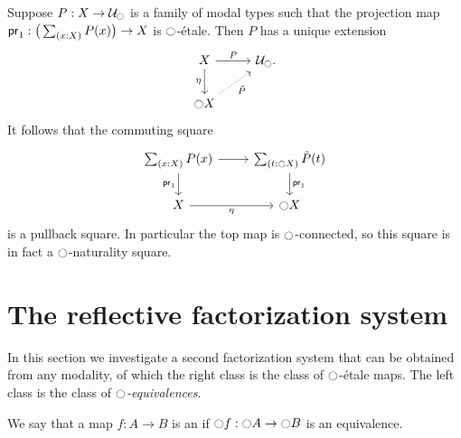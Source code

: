 \documentclass[9pt,twosided]{amsart}
\begin{document}
\begin{cor}
Suppose $P:X\to\mathcal{U}_{\ocircle}$ is a family of modal types such that the projection map $\proj 1:\big(\sm{x:X}P(x)\big)\to X$ is ${\ocircle}$-\'etale. Then $P$ has a unique extension
\begin{equation*}
\begin{tikzcd}
X \arrow[d,swap,"\modalunit"] \arrow[r,"P"] & \UU_\modal. \\
\modal X \arrow[ur,densely dotted,swap,"\tilde{P}"] 
\end{tikzcd}
\end{equation*}
It follows that the commuting square
\begin{equation*}
\begin{tikzcd}
\sm{x:X}P(x) \arrow[d,swap,"\proj 1"] \arrow[r] & \sm{t:\modal X}\tilde{P}(t) \arrow[d,"\proj 1"] \\
X \arrow[r,swap,"\modalunit"] & \modal X
\end{tikzcd}
\end{equation*}
is a pullback square. In particular the top map is ${\ocircle}$-connected, so this square is in fact a ${\ocircle}$-naturality square.
\end{cor}

\section{The reflective factorization system}

In this section we investigate a second factorization system that can be obtained from any modality, of which the right class is the class of ${\ocircle}$-\'etale maps. The left class is the class of \emph{${\ocircle}$-equivalences}.

\begin{defn}
We say that a map $f:A\to B$ is an  if ${\ocircle} f:{\ocircle} A\to {\ensuremath{\ocircle}} B$ is an equivalence.
\end{defn}
\end{document}
